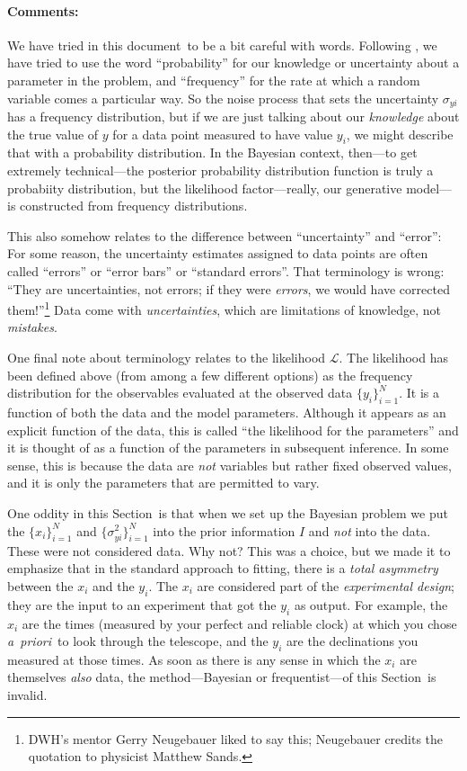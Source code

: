 \documentclass[12pt,twoside]{article}
\newcommand{\notenglish}[1]{\textsl{#1}}
\newcommand{\apriori}{\notenglish{a~priori}}
\newcommand{\documentname}{document}
\newcommand{\sectionname}{Section}
\newcommand{\commentsname}{Comments}
\newcounter{problem}
\newenvironment{comments}{\paragraph{\commentsname:}}{}
\newcommand{\setofall}[3]{\{{#1}\}_{{#2}}^{{#3}}}
\newcommand{\allx}{\setofall{x_i}{i=1}{N}}
\newcommand{\ally}{\setofall{y_i}{i=1}{N}}
\newcommand{\allsigmay}{\setofall{\sigma_{yi}^2}{i=1}{N}}
\newcommand{\like}{\mathscr{L}}
\begin{document}
\begin{comments}
We have tried in this \documentname\ to be a bit careful with words.
Following \citet{jaynes}, we have tried to use the word
``probability'' for our knowledge or uncertainty about a parameter in
the problem, and ``frequency'' for the rate at which a random variable
comes a particular way.  So the noise process that sets the
uncertainty $\sigma_{yi}$ has a frequency distribution, but if we are
just talking about our \emph{knowledge} about the true value of $y$
for a data point measured to have value $y_i$, we might describe that
with a probability distribution.  In the Bayesian context, then---to
get extremely technical---the posterior probability distribution
function is truly a probabiity distribution, but the likelihood
factor---really, our generative model---is constructed from frequency
distributions.

This also somehow relates to the difference between ``uncertainty''
and ``error'': For some reason, the uncertainty estimates assigned to
data points are often called ``errors'' or ``error bars'' or
``standard errors''.  That terminology is wrong: ``They are
uncertainties, not errors; if they were \emph{errors}, we would have
corrected them!''\footnote{DWH's mentor Gerry Neugebauer liked to say
  this; Neugebauer credits the quotation to physicist Matthew Sands.}
Data come with \emph{uncertainties}, which are limitations of
knowledge, not \emph{mistakes}.

One final note about terminology relates to the likelihood $\like$.
The likelihood has been defined above (from among a few different
options) as the frequency distribution for the observables evaluated
at the observed data $\ally$.  It is a function of both the data and
the model parameters.  Although it appears as an explicit function of
the data, this is called ``the likelihood for the parameters'' and it
is thought of as a function of the parameters in subsequent inference.
In some sense, this is because the data are \emph{not} variables but
rather fixed observed values, and it is only the parameters that are
permitted to vary.

One oddity in this \sectionname\ is that when we set up the Bayesian
problem we put the $\allx$ and $\allsigmay$ into the prior information
$I$ and \emph{not} into the data.  These were not considered data.
Why not?  This was a choice, but we made it to emphasize that in the
standard approach to fitting, there is a \emph{total asymmetry}
between the $x_i$ and the $y_i$.  The $x_i$ are considered part of the
\emph{experimental design}; they are the input to an experiment that
got the $y_i$ as output.  For example, the $x_i$ are the times
(measured by your perfect and reliable clock) at which you chose
\apriori\ to look through the telescope, and the $y_i$ are the
declinations you measured at those times.  As soon as there is any
sense in which the $x_i$ are themselves \emph{also} data, the
method---Bayesian or frequentist---of this \sectionname\ is invalid.


\end{comments}
\end{document}
